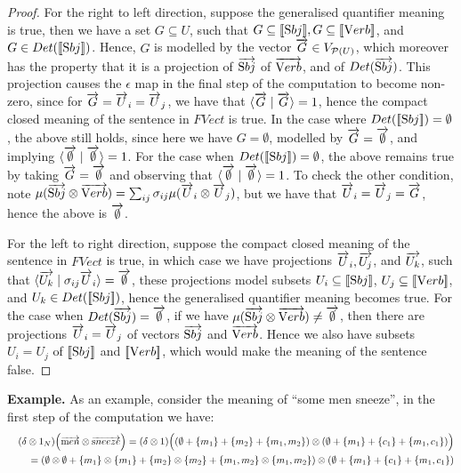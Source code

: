 \begin{proof}
For the right to left direction, suppose the generalised quantifier meaning is true, then we have a set $G \subseteq U$, such that  $G\subseteq[\![ \text Sbj ]\!], G \subseteq [\![ \text Verb ]\!]$, and $G \in Det ([\![ \text Sbj ]\!])$. Hence, $G$ is modelled by the vector $\overrightarrow{G} \in V_{{\cal P}(U)}$, which moreover has the property that it is a projection of $\overrightarrow{\text Sbj}$ of  $\overrightarrow{\text Verb}$, and of $Det(\overrightarrow{\text Sbj})$. This projection  causes the $\epsilon$ map in the final step of the computation to become non-zero, since for $\overrightarrow{G} = \overrightarrow{U}_i = \overrightarrow{U}_j$, we have that  $\langle \overrightarrow{G} \mid \overrightarrow{G}\rangle = {1}$, hence the compact closed meaning of the sentence in $FVect$ is  true. In the case where $Det([\![ \text Sbj ]\!]) = \emptyset$, the above still holds, since here we  have $G = {\emptyset}$, modelled by  $\overrightarrow{G} = \overrightarrow{\emptyset}$, and implying  $\langle \overrightarrow{\emptyset} \mid \overrightarrow{\emptyset} \rangle = 1$. For the case when $Det([\![ \text Sbj ]\!]) = \emptyset$, the above remains true by taking $\overrightarrow{G} = \overrightarrow{\emptyset}$ and observing that $\langle \overrightarrow{\emptyset} \mid \overrightarrow{\emptyset} \rangle = 1$.  To check  the other condition, note  $
\mu(\overrightarrow{\text Sbj} \otimes \overrightarrow{\text Verb}) = \sum_{ij} \sigma_{ij} \mu(\overrightarrow{U}_i \otimes \overrightarrow{U}_j)$, 
but we have that  $\overrightarrow{U}_i = \overrightarrow{U}_j = \overrightarrow{G}$, hence the above is   $\overrightarrow{\emptyset}$. 

For the left to right direction, suppose the compact closed meaning of the sentence in $FVect$ is true, in which case we have projections $\overrightarrow{U}_i, \overrightarrow{U_j}$, and $\overrightarrow{U_k}$, such that $\langle \overrightarrow{U_k} \mid \sigma_{ij} \overrightarrow{U}_i \rangle = \overrightarrow{\emptyset}$, these projections model subsets $U_i \subseteq [\![ \text Sbj ]\!]$, $U_j \subseteq [\![ \text Verb ]\!]$, and $U_k \in Det([\![ \text Sbj ]\!])$, hence the generalised quantifier meaning becomes true. For the case when $Det(\overrightarrow{\text Sbj}) = \overrightarrow{\emptyset}$,  if we have  $\mu(\overrightarrow{\text Sbj} \otimes \overrightarrow{\text Verb}) \neq \overrightarrow{\emptyset}$, then there are projections $\overrightarrow{U}_i= \overrightarrow{U}_j$ of vectors $\overrightarrow{\text Sbj}$ and $\overrightarrow{\text Verb}$. Hence we  also have subsets $U_i = U_j$ of  $[\![ \text Sbj ]\!]$ and $ [\![ \text Verb ]\!]$, which would  make the meaning of the sentence false.  
\end{proof}

\bigskip
\noindent
{\bf Example.}
As an example,  consider  the  meaning  of  ``some men sneeze'', in the first step of the computation we have:
\begin{eqnarray*}
&&(\delta \otimes 1_N) \Big(\overrightarrow{\text men} \otimes \overrightarrow{\text sneeze}\Big) = (\delta \otimes 1) \Big((\emptyset + \{m_1\} + \{m_2\} + \{m_1, m_2\}) \otimes (\emptyset + \{m_1\} + \{c_1\} + \{m_1, c_1\}) \Big)\\
&&=  (\emptyset \otimes \emptyset + \{m_1\} \otimes \{m_1\} + \{m_2\} \otimes \{m_2\} + \{m_1, m_2\} \otimes \{m_1, m_2\}) \otimes (\emptyset + \{m_1\} + \{c_1\} + \{m_1, c_1\})
\end{eqnarray*}

